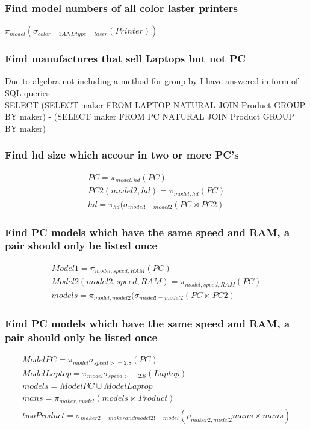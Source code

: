 \documentclass[12pt, a4paper]{article}
\begin{document}
				\subsubsection{Find model numbers of all color laster printers}
					$\pi_{model}(\sigma_{color = 1 AND type = laser}(Printer))$
				\subsubsection{Find manufactures that sell Laptops but not PC}
					Due to algebra not including a method for group by I have answered in form of SQL queries.\\
					SELECT (SELECT maker FROM LAPTOP NATURAL JOIN Product GROUP BY maker)  -  (SELECT maker FROM PC NATURAL JOIN Product GROUP BY maker)
				\subsubsection{Find hd size which accour in two or more PC's}
					\begin{align*}
						PC = \pi_{model,hd}(PC)\\
						PC2(model2,hd) = \pi_{model,hd}(PC)\\
						hd = \pi_{hd}(\sigma_{model != model2}(PC \bowtie PC2)
					\end{align*}
				\subsubsection{Find PC models which have the same speed and RAM, a pair should only be listed once}
					\begin{align*}
						Model1 = \pi_{model,speed,RAM}(PC)\\
						Model2(model2,speed,RAM) = \pi_{model,speed,RAM}(PC)\\
						models = \pi_{model,model2}(\sigma_{model != model2}(PC \bowtie PC2)
 					\end{align*}			
				\subsubsection{Find PC models which have the same speed and RAM, a pair should only be listed once}
					\begin{align*}
						ModelPC = \pi_{model}\sigma_{speed >= 2.8}(PC)\\
						ModelLaptop = \pi_{model}\sigma_{speed >= 2.8}(Laptop)\\
						models = ModelPC \cup ModelLaptop\\
						mans = \pi_{maker,model}(models \bowtie Product)\\
						twoProduct = \sigma_{maker2 = maker and model2 != model}(\rho_{maker2,model2}mans \times mans)
 					\end{align*}			
\end{document}

